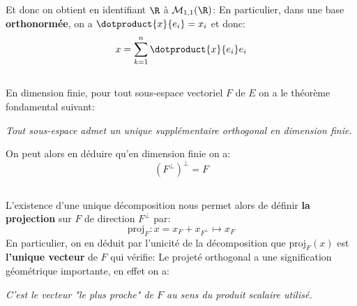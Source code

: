 Et donc on obtient en identifiant \(\R\) à \(\mathcal{M}_{1, 1}(\R)\):
En particulier, dans une base \textbf{orthonormée}, on a \(\dotproduct{x}{e_i} = x_i\) et donc:
\[
   x = \sum_{k=1}^{n} \dotproduct{x}{e_i}e_i 
\]
\subsection*{}
En dimension finie, pour tout sous-espace vectoriel \(F\) de \(E\) on a le théorème fondamental suivant:
\begin{center}
   \textit{Tout sous-espace admet un unique supplémentaire orthogonal en dimension finie.}
\end{center}
On peut alors en déduire qu'en dimension finie on a:
\[
   (F^\perp)^\perp = F   
\]

\subsection*{}
L'existence d'une unique décomposition nous permet alors de définir \textbf{la projection} sur \(F\) de direction \(F^\perp\) par:
\[
   \text{proj}_F : x = x_F + x_{F^\perp} \mapsto x_F   
\]
En particulier, on en déduit par l'unicité de la décomposition que \(\text{proj}_F(x)\) est \textbf{l'unique vecteur} de \(F\) qui vérifie:
Le projeté orthogonal a une signification géométrique importante, en effet on a:
\begin{center}
   \textit{C'est le vecteur "le plus proche" de \(F\) au sens du produit scalaire utilisé.}
\end{center}
\pagebreak

